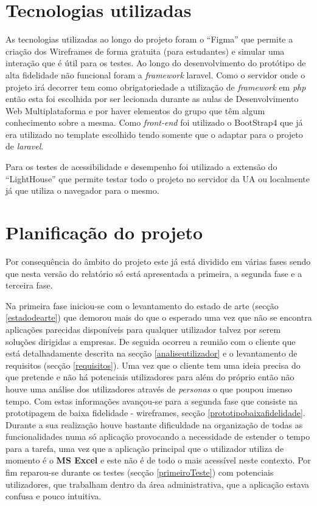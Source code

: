 \documentclass[11pt, twoside]{report}
\begin{document}
	\chapter{Tecnologias utilizadas}
	
	As tecnologias utilizadas ao longo do projeto foram o ``Figma'' que permite a criação dos Wireframes de forma gratuita (para estudantes) e simular uma interação que é útil para os testes. Ao longo do desenvolvimento do protótipo de alta fidelidade não funcional foram a \textit{framework} laravel.
	Como o servidor onde o projeto irá decorrer tem como obrigatoriedade a utilização de \textit{framework} em \textit{php} então esta foi escolhida por ser lecionada durante as aulas de Desenvolvimento Web Multiplataforma e por haver elementos do grupo que têm algum conhecimento sobre a mesma. Como \textit{front-end} foi utilizado o BootStrap4 que já era utilizado no template escolhido tendo somente que o adaptar para o projeto de \textit{laravel}.
	
	Para os testes de acessibilidade e desempenho foi utilizado a extensão do ``LightHouse'' que permite testar todo o projeto no servidor da UA ou localmente já que utiliza o navegador para o mesmo. 
	
	
	
	\chapter{Planificação do projeto}

 	Por consequência do âmbito do projeto este já está dividido em várias fases sendo que nesta versão do relatório só está apresentada a primeira, a segunda fase e a terceira fase.
 	
 	Na primeira fase iniciou-se com o levantamento do estado de arte (secção \ref{estadodearte}) que demorou mais do que o esperado uma vez que não se encontra aplicações parecidas disponíveis para qualquer utilizador talvez por serem soluções dirigidas a empresas.
 	De seguida ocorreu a reunião com o cliente que está detalhadamente descrita na secção \ref{analiseutilizador} e o levantamento de requisitos (secção \ref{requisitos}).
 	Uma vez que o cliente tem uma ideia precisa do que pretende e não há potenciais utilizadores para além do próprio então não houve uma análise dos utilizadores através de \textit{personas} o que poupou imenso tempo.
 	Com estas informações  avançou-se para a segunda fase que consiste na prototipagem de baixa fidelidade - wireframes, secção \ref{prototipobaixafidelidade}.
 	Durante a sua realização houve bastante dificuldade na organização de todas as funcionalidades numa só aplicação provocando a necessidade de estender o tempo para a tarefa, uma vez que a aplicação principal que o utilizador utiliza de momento é o \textbf{MS Excel} e este não é de todo o mais acessível neste contexto.
 	Por fim reparou-se durante os testes (secção \ref{primeiroTeste}) com potenciais utilizadores, que trabalham dentro da área administrativa, que a aplicação estava confusa e pouco intuitiva.
 	
\end{document}
